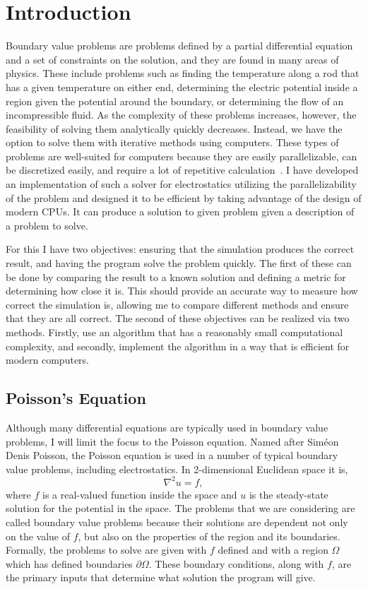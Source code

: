 \section{Introduction}


Boundary value problems are problems defined by a partial differential equation and a set of
constraints on the solution, and they are found in many areas of physics. These include problems
such as finding the temperature along a rod that has a given temperature on either end,
determining the electric potential inside a region given the potential around the
boundary, or determining the flow of an incompressible fluid. As the complexity of
these problems increases, however, the feasibility of solving them analytically
quickly decreases. Instead, we have the option to solve them with iterative methods
using computers. These types of problems are well-suited for computers because
they are easily parallelizable, can be discretized easily, and require a lot of repetitive calculation~\cite{parallel}. I have developed an
implementation of such a solver for electrostatics utilizing the 
parallelizability of the problem and designed it to be efficient by taking advantage 
of the design of modern CPUs. It can produce a solution to given problem given a description
of a problem to solve.

For this I have two objectives: ensuring that the simulation produces the correct
result, and having the program solve the problem quickly. The first of these can be done by comparing the
result to a known solution and defining a metric for determining how close it is.
This should provide an accurate way to measure how correct the simulation is, allowing
me to compare different methods and ensure that they are all correct.
The second of these objectives can be realized via two methods. Firstly, use an
algorithm that has a reasonably small computational complexity, and secondly,
implement the algorithm in a way that is efficient for modern computers.

\subsection{Poisson's Equation}

Although many differential equations are typically used in boundary value problems,
I will limit the focus to the Poisson equation. Named after Siméon Denis Poisson, the Poisson equation
is used in a number of typical boundary value problems, including electrostatics.
In 2-dimensional Euclidean space it is,
$$\nabla^2 u = f,$$
where $f$ is a real-valued function inside the space and $u$ is the steady-state
solution for the potential in the space\cite{boas}. The problems that we are considering are called boundary value problems
because their solutions are dependent not only on the value of $f$, but also on the properties of the region and its boundaries.
Formally, the problems to solve are given with $f$ defined and with a region $\Omega$ which has defined boundaries
$\partial\Omega$. These boundary conditions, along with $f$, are the primary inputs that determine what solution the
program will give.

